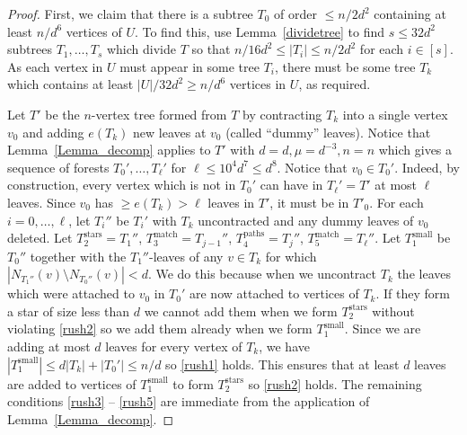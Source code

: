 \begin{proof}
First, we claim that there is a subtree $T_0$ of order $\leq n/2d^2$ containing at least $n/d^6$ vertices of $U$. To find this, use Lemma~\ref{dividetree} to find $s\leq 32d^2$ subtrees $T_1,\ldots, T_{s}$ which divide $T$ so that $n/16d^2\leq |T_i|\leq n/2d^2$ for each $i\in [s]$. As each vertex in $U$ must appear in some tree $T_i$,  there must be some tree $T_k$ which contains at least $|U|/32d^2\geq n/d^6$ vertices in $U$, as required.

  Let  $T'$ be the $n$-vertex tree  formed from $T$ by contracting $T_k$ into a single vertex $v_0$ and adding $e(T_k)$ new leaves at $v_0$ (called ``dummy'' leaves). 
Notice that  Lemma~\ref{Lemma_decomp} applies to  $T'$ with    $d=d, \mu= d^{-3}, n=n$ which gives a sequence of forests $T_0', \dots, T_{\ell}'$ for $\ell\leq 10^4d^7\leq d^8$.
Notice that $v_0\in T_0'$. Indeed, by construction, every vertex which is not in $T_0'$ can have in $T_{\ell}'=T'$ at most $\ell$ leaves. Since $v_0$ has $\geq  e(T_k)>\ell$ leaves in $T'$, it must be in $T'_0$.
For each $i=0, \dots, {\ell}$, let $T_i''$ be $T_i'$ with $T_k$ uncontracted and any dummy leaves of $v_0$ deleted.
Let  $T_2^{\mathrm{stars}}=T_1''$, $T_3^{\mathrm{match}}=T_{j-1}''$, $T_4^{\mathrm{paths}}=T_j''$, $T_5^{\mathrm{match}}=T_{\ell}''$.
Let $T_1^{\mathrm{small}}$ be $T_0''$ together with the $T_1''$-leaves of any $v\in T_k$ for which $|N_{T_1''}(v)\setminus N_{T_0''}(v)|<d$. We do this because when we uncontract $T_k$ the leaves which were attached to $v_0$ in $T_0'$ are now attached to vertices of $T_k$. 
If they form a star of size less than $d$ we cannot add them when we form $T_2^{\mathrm{stars}}$ without violating \ref{rush2} so we add them already when we form $T_1^{\mathrm{small}}$.
Since we are adding at most $d$ leaves for every vertex of $T_k$, we have $|T_1^{\mathrm{small}}|\leq d|T_k|+|T_0'|\leq  n/d$ so \ref{rush1} holds. This ensures that at least $d$ leaves are added to vertices of $T_1^{\mathrm{small}}$ to form  $T_2^{\mathrm{stars}}$ so \ref{rush2} holds. The remaining conditions \ref{rush3} -- \ref{rush5} are immediate from the application of Lemma~\ref{Lemma_decomp}.
\end{proof}





